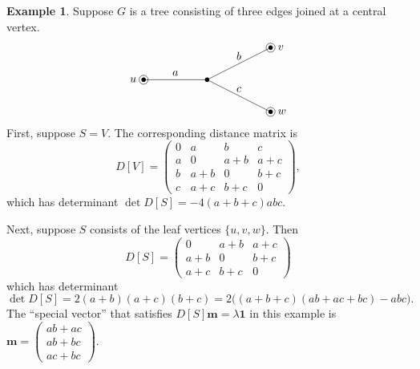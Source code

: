 \documentclass{amsart}
\theoremstyle{definition}
\newtheorem{eg}[thm]{Example}
\newcommand{\boldm}{\mathbf{m}}
\begin{document}
\begin{eg}
Suppose $G$ is a tree consisting of three edges joined at a central vertex.
\[
\begin{tikzpicture}
	\coordinate (u) at (-2,0);
	\coordinate (v) at (2,1);
	\coordinate (w) at (2,-1);
	\coordinate (o) at (0,0);

	\draw (o) -- node[above] {$a$} (u);
	\draw (v) -- node[above] {$b$} (o)
		-- node[above] {$c$} (w);

	\foreach \c in {u, v, w, o} {
		\fill (\c) circle (2pt);
	}
	\foreach \c in {u, v, w} {
		\draw (\c) circle (4pt);
	}
	
	\node[left=3pt] at (u) {$u$};
	\node[right=3pt] at (v) {$v$};
	\node[right=3pt] at (w) {$w$};
\end{tikzpicture}
\]
First, suppose $S = V$.
The corresponding distance matrix is
\[
	D[V] = \begin{pmatrix}
	0 & a & b & c \\
	a & 0 & a + b & a + c \\
	b & a + b & 0 & b + c \\
	c & a + c & b + c & 0
	\end{pmatrix},
\]
which has determinant
$
	\det D[S] = -4(a+b+c)abc.
$

Next, suppose $S$ consists of the leaf vertices $ \{u,v,w\}$.
Then 
\[
	D[S] = \begin{pmatrix}
	0 & a + b & a + c \\
	a + b & 0 & b + c \\
	a + c & b + c & 0
	\end{pmatrix}
\]
which has determinant
$
	\det D[S] = 2(a+b)(a+c)(b+c) 
	= 2\Big( (a+b+c)(ab + ac + bc) - abc \Big).
$
The ``special vector'' that satisfies $D[S] \boldm = \lambda \mathbf{1}$ in this example is 
$\displaystyle
	\boldm = \begin{pmatrix} 
	ab + ac \\ 
	ab + bc \\
	ac + bc 
	\end{pmatrix}.
$
\end{eg}
\end{document}
